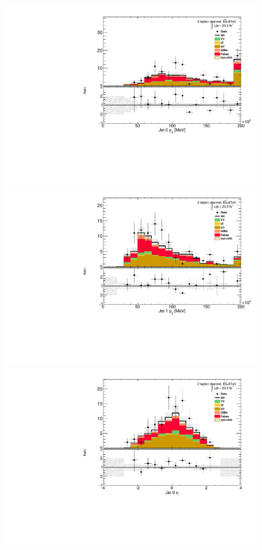 \begin{figure}[!htbp]
  \begin{minipage}[h]{0.5\textwidth}
    \centering \includegraphics[width=\textwidth]{figs/results/plotCand_2lep_Jet0Pt}
  \end{minipage}\hfill
  \begin{minipage}[h]{0.5\textwidth}
    \centering \includegraphics[width=\textwidth]{figs/results/plotCand_2lep_Jet1Pt}
  \end{minipage}\hfill
  \begin{minipage}[h]{0.5\textwidth}
    \centering \includegraphics[width=\textwidth]{figs/results/plotCand_2lep_Jet0Eta}

\end{minipage}
\end{figure}
